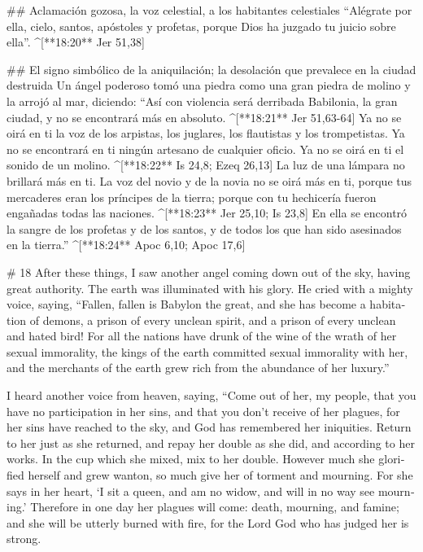 \begin{paracols}{2}
## Aclamación gozosa, la voz celestial, a los habitantes celestiales
 “Alégrate por ella, cielo, santos, apóstoles y profetas, porque Dios ha juzgado tu juicio sobre ella”. ^[**18:20** Jer 51,38]

## El signo simbólico de la aniquilación; la desolación que prevalece en la ciudad destruida
 Un ángel poderoso tomó una piedra como una gran piedra de molino y la arrojó al mar, diciendo: “Así con violencia será derribada Babilonia, la gran ciudad, y no se encontrará más en absoluto. ^[**18:21** Jer 51,63-64]  Ya no se oirá en ti la voz de los arpistas, los juglares, los flautistas y los trompetistas. Ya no se encontrará en ti ningún artesano de cualquier oficio. Ya no se oirá en ti el sonido de un molino. ^[**18:22** Is 24,8; Ezeq 26,13]  La luz de una lámpara no brillará más en ti. La voz del novio y de la novia no se oirá más en ti, porque tus mercaderes eran los príncipes de la tierra; porque con tu hechicería fueron engañadas todas las naciones. ^[**18:23** Jer 25,10; Is 23,8]  En ella se encontró la sangre de los profetas y de los santos, y de todos los que han sido asesinados en la tierra.” ^[**18:24** Apoc 6,10; Apoc 17,6]

\switchcolumn
\begin{english}

# 18
 After these things, I saw another angel coming down out of the sky, having great authority. The earth was illuminated with his glory.  He cried with a mighty voice, saying, “Fallen, fallen is Babylon the great, and she has become a habitation of demons, a prison of every unclean spirit, and a prison of every unclean and hated bird!  For all the nations have drunk of the wine of the wrath of her sexual immorality, the kings of the earth committed sexual immorality with her, and the merchants of the earth grew rich from the abundance of her luxury.” 

 I heard another voice from heaven, saying, “Come out of her, my people, that you have no participation in her sins, and that you don’t receive of her plagues,  for her sins have reached to the sky, and God has remembered her iniquities.  Return to her just as she returned, and repay her double as she did, and according to her works. In the cup which she mixed, mix to her double.  However much she glorified herself and grew wanton, so much give her of torment and mourning. For she says in her heart, ‘I sit a queen, and am no widow, and will in no way see mourning.’  Therefore in one day her plagues will come: death, mourning, and famine; and she will be utterly burned with fire, for the Lord God who has judged her is strong. 


\end{english}
\end{paracols}
